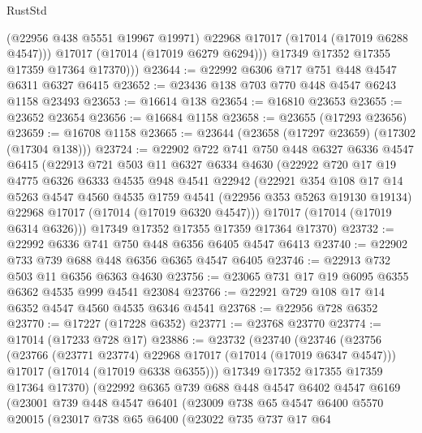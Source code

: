 \begin{lexlean}{RustStd}
\begin{coremodule}
{\begin{coremodule}
{{{{{{{{{{{{{{{{{{{{{{{{{{{{{{{{{{{{{{{{{{{{{{{{{{{{{{{              (@22956 @438 @5551 @19967 @19971)
              @22968
              @17017
              (@17014 (@17019 @6288 @4547)))
            @17017
            (@17014 (@17019 @6279 @6294)))
          @17349
          @17352
          @17355
          @17359
          @17364
          @17370)))
@23644 := @22992 @6306 @717 @751 @448 @4547 @6311 @6327 @6415
@23652 := @23436 @138 @703 @770 @448 @4547 @6243 @1158 @23493
@23653 := @16614 @138
@23654 := @16810 @23653
@23655 := @23652 @23654
@23656 := @16684 @1158
@23658 := @23655 (@17293 @23656)
@23659 := @16708 @1158
@23665 := @23644 (@23658 (@17297 @23659) (@17302 (@17304 @138)))
@23724 := @22902
    @722
    @741
    @750
    @448
    @6327
    @6336
    @4547
    @6415
    (@22913
      @721
      @503
      @11
      @6327
      @6334
      @4630
      (@22922
        @720
        @17
        @19
        @4775
        @6326
        @6333
        @4535
        @948
        @4541
        @22942
        (@22921
          @354
          @108
          @17
          @14
          @5263
          @4547
          @4560
          @4535
          @1759
          @4541
          (@22956 @353 @5263 @19130 @19134)
          @22968
          @17017
          (@17014 (@17019 @6320 @4547)))
        @17017
        (@17014 (@17019 @6314 @6326)))
      @17349
      @17352
      @17355
      @17359
      @17364
      @17370)
@23732 := @22992 @6336 @741 @750 @448 @6356 @6405 @4547 @6413
@23740 := @22902 @733 @739 @688 @448 @6356 @6365 @4547 @6405
@23746 := @22913 @732 @503 @11 @6356 @6363 @4630
@23756 := @23065 @731 @17 @19 @6095 @6355 @6362 @4535 @999 @4541 @23084
@23766 := @22921 @729 @108 @17 @14 @6352 @4547 @4560 @4535 @6346 @4541
@23768 := @22956 @728 @6352
@23770 := @17227 (@17228 @6352)
@23771 := @23768 @23770
@23774 := @17014 (@17233 @728 @17)
@23886 := @23732
    (@23740
      (@23746
        (@23756
          (@23766 (@23771 @23774) @22968 @17017 (@17014 (@17019 @6347 @4547)))
          @17017
          (@17014 (@17019 @6338 @6355)))
        @17349
        @17352
        @17355
        @17359
        @17364
        @17370)
      (@22992
        @6365
        @739
        @688
        @448
        @4547
        @6402
        @4547
        @6169
        (@23001
          @739
          @448
          @4547
          @6401
          (@23009
            @738
            @65
            @4547
            @6400
            @5570
            @20015
            (@23017
              @738
              @65
              @6400
              (@23022
                @735
                @737
                @17
                @64
}}}}}}}}}}}}}}}}}}}}}}}}}}}}}}}}}}}}}}}}}}}}}}}}}}}}}}}
\end{coremodule}}
\end{coremodule}
\end{lexlean}
